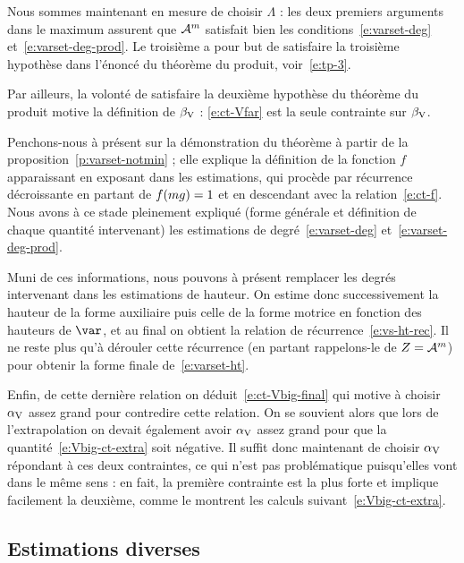 Nous sommes maintenant en mesure de choisir \( \Lambda \) : les deux premiers
arguments dans le maximum assurent que \( \mathcal A^m \) satisfait bien les
conditions~\eqref{e:varset-deg} et~\eqref{e:varset-deg-prod}. Le troisième a
pour but de satisfaire la troisième hypothèse dans l'énoncé du théorème du
produit, voir~\eqref{e:tp-3}.

Par ailleurs, la volonté de satisfaire la deuxième hypothèse du théorème du
produit motive la définition de \( \beta \sb{\mathrm{V}} \) : \eqref{e:ct-Vfar} est la seule
contrainte sur \( \beta \sb{\mathrm{V}} \).

Penchons-nous à présent sur la démonstration du théorème à partir de la
proposition~\ref{p:varset-notmin} ; elle explique la définition de la fonction
\( f \) apparaissant en exposant dans les estimations, qui procède par
récurrence décroissante en partant de \( f(mg) = 1 \) et en
descendant avec la relation~\eqref{e:ct-f}. Nous avons à ce stade pleinement
expliqué (forme générale et définition de chaque quantité intervenant) les
estimations de degré~\eqref{e:varset-deg} et~\eqref{e:varset-deg-prod}.

Muni de ces informations, nous pouvons à présent remplacer les degrés
intervenant dans les estimations de hauteur. On estime donc successivement la
hauteur de la forme auxiliaire puis celle de la forme motrice en fonction
des hauteurs de \( \var \), et au final on obtient la relation de
récurrence~\eqref{e:vs-ht-rec}. Il ne reste plus qu'à dérouler cette
récurrence (en partant rappelons-le de \( Z = \mathcal A^m \)) pour obtenir la
forme finale de~\eqref{e:varset-ht}.

Enfin, de cette dernière relation on déduit~\eqref{e:ct-Vbig-final} qui
motive à choisir \( \alpha \sb{\mathrm{V}} \) assez grand pour contredire cette relation. On se
souvient alors que lors de l'extrapolation on devait également avoir \( \alpha \sb{\mathrm{V}}
\) assez grand pour que la quantité~\eqref{e:Vbig-ct-extra} soit négative.
Il suffit donc maintenant de choisir \( \alpha \sb{\mathrm{V}} \) répondant à ces deux
contraintes, ce qui n'est pas problématique puisqu'elles vont dans le même
sens : en fait, la première contrainte est la plus forte et implique
facilement la deuxième, comme le montrent les calculs
suivant~\eqref{e:Vbig-ct-extra}.


\subsection{Estimations diverses}

